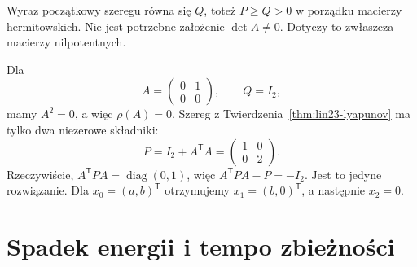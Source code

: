 \begin{uwaga}
\label{rem:lin23-singular}
Wyraz początkowy szeregu
równa się \(Q\), toteż
\(P\ge Q>0\) w porządku
macierzy hermitowskich.
Nie jest potrzebne założenie
\(\det A\ne0\).
Dotyczy to zwłaszcza
macierzy nilpotentnych.
\end{uwaga}

\begin{przyklad}
\label{prz:lin23-nilpotent}
Dla
\[
 A=\begin{pmatrix}0&1\\0&0\end{pmatrix},
 \qquad Q=I_2,
\]
mamy \(A^2=0\),
a więc \(\rho(A)=0\).
Szereg z
Twierdzenia~\ref{thm:lin23-lyapunov}
ma tylko dwa niezerowe składniki:
\[
 P=I_2+A^{\mathsf T}A
 =\begin{pmatrix}1&0\\0&2\end{pmatrix}.
\]
Rzeczywiście,
\(A^{\mathsf T}PA
=\operatorname{diag}(0,1)\),
więc \(A^{\mathsf T}PA-P=-I_2\).
Jest to jedyne rozwiązanie.
Dla \(x_0=(a,b)^{\mathsf T}\)
otrzymujemy \(x_1=(b,0)^{\mathsf T}\),
a następnie \(x_2=0\).
\end{przyklad}

\section{Spadek energii i tempo zbieżności}
\label{sec:lin23-energy}

